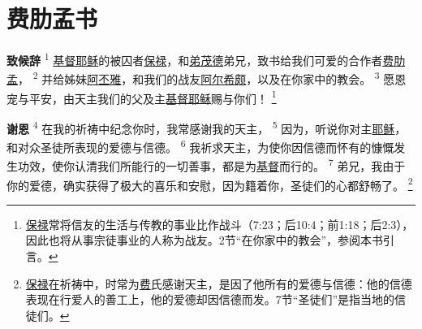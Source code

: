 \chapter*{费肋孟书}


\textbf{致候辞\quad}
\textsuperscript{1}
\uline{基督}\uline{耶稣}的被囚者\uline{保禄}，和\uline{弟茂德}弟兄，致书给我们可爱的合作者\uline{费肋孟}，
\textsuperscript{2}
并给姊妹\uline{阿丕雅}，和我们的战友\uline{阿尔希颇}，以及在你家中的教会。
\textsuperscript{3}
愿恩宠与平安，由天主我们的父及主\uline{基督}\uline{耶稣}赐与你们！
\renewcommand\thefootnote{\ding{\numexpr171+\value{footnote}}}
\footnote{\uline{保禄}常将信友的生活与传教的事业比作战斗（7:23；后10:4；前1:18；后2:3），因此也将从事宗徒事业的人称为战友。2节“在你家中的教会”，参阅本书引言。}

\textbf{谢恩\quad}
\textsuperscript{4}
在我的祈祷中纪念你时，我常感谢我的天主，
\textsuperscript{5}
因为，听说你对主\uline{耶稣}，和对众圣徒所表现的爱德与信德。
\textsuperscript{6}
我祈求天主，为使你因信德而怀有的慷慨发生功效，使你认清我们所能行的一切善事，都是为\uline{基督}而行的。
\textsuperscript{7}
弟兄，我由于你的爱德，确实获得了极大的喜乐和安慰，因为籍着你，圣徒们的心都舒畅了。
\footnote{\uline{保禄}在祈祷中，时常为\uline{费}氏感谢天主，是因了他所有的爱德与信德：他的信德表现在行爱人的善工上，他的爱德却因信德而发。7节“圣徒们”是指当地的信徒们。}

